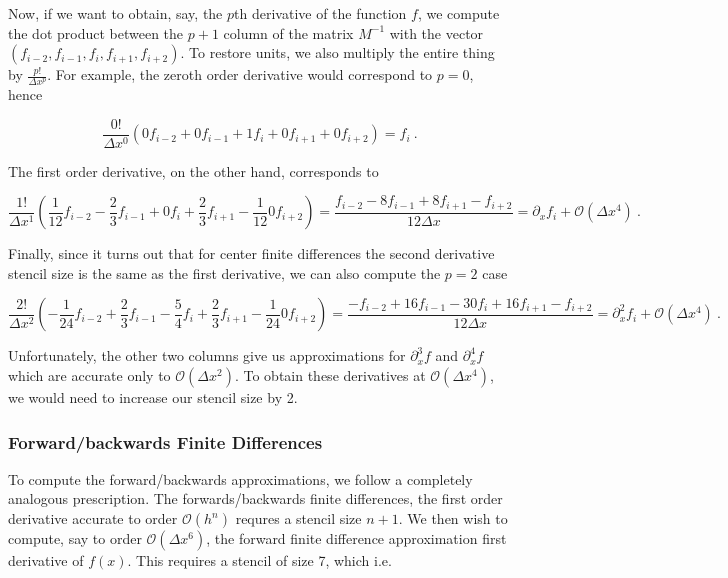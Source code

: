 \documentclass[a4paper,11pt]{article}
\begin{document}
Now, if we want to obtain, say, the $p$th derivative of the function $f$, we compute the dot product between the $p+1$ column of the matrix $M^{-1}$ with the vector $\left(f_{i-2},f_{i-1},f_{i},f_{i+1},f_{i+2}\right)$. To restore units, we also multiply the entire thing by $\frac{p!}{\Delta x^{p}}$. For example, the zeroth order derivative would correspond to $p=0$, hence

\begin{equation}
\frac{0!}{\Delta x^{0}}\left(0f_{i-2} + 0f_{i-1} + 1f_{i} + 0f_{i+1} + 0f_{i+2}\right) = f_{i}\ .
\end{equation}

The first order derivative, on the other hand, corresponds to

\begin{equation}
\frac{1!}{\Delta x^{1}}\left(\frac{1}{12}f_{i-2} - \frac{2}{3}f_{i-1} + 0f_{i} + \frac{2}{3}f_{i+1} - \frac{1}{12}0f_{i+2}\right) = \frac{f_{i-2} - 8f_{i-1} + 8f_{i+1} - f_{i+2}}{12\Delta x} = \partial_{x}f_{i} + \mathcal{O}\left(\Delta x^{4}\right)\ .
\end{equation}

Finally, since it turns out that for center finite differences the second derivative stencil size is the same as the first derivative, we can also compute the $p=2$ case

\begin{equation}
\frac{2!}{\Delta x^{2}}\left(-\frac{1}{24}f_{i-2} + \frac{2}{3}f_{i-1} - \frac{5}{4}f_{i} + \frac{2}{3}f_{i+1} - \frac{1}{24}0f_{i+2}\right) = \frac{-f_{i-2} + 16f_{i-1} -30f_{i} + 16f_{i+1} - f_{i+2}}{12\Delta x} = \partial_{x}^{2}f_{i} + \mathcal{O}\left(\Delta x^{4}\right)\ .
\end{equation}

Unfortunately, the other two columns give us approximations for $\partial_{x}^{3}f$ and $\partial_{x}^{4}f$ which are accurate only to $\mathcal{O}\left(\Delta x^{2}\right)$. To obtain these derivatives at $\mathcal{O}\left(\Delta x^{4}\right)$, we would need to increase our stencil size by 2.

\subsubsection{Forward/backwards Finite Differences}

To compute the forward/backwards approximations, we follow a completely analogous prescription. The forwards/backwards finite differences, the first order derivative accurate to order $\mathcal{O}\left(h^{n}\right)$ requres a stencil size $n+1$. We then wish to compute, say to order $\mathcal{O}\left(\Delta x^{6}\right)$, the forward finite difference approximation first derivative of $f(x)$. This requires a stencil of size 7, which i.e.
\end{document}
